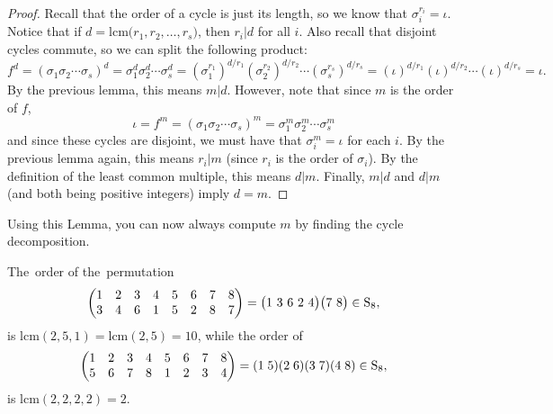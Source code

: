 \documentclass[11pt,dvipsnames]{book}
\numberwithin{figure}{section} %
\numberwithin{table}{section} %
\begin{document}
\begin{proof}
Recall that the order of a cycle is just its length, so we know that $\sigma_i^{r_i}=\iota$. 
Notice that if $d= \mathrm{lcm}\big(r_{1},r_{2},\ldots,r_{s}\big)$, then $r_i|d$ for all $i$. Also recall that disjoint cycles commute, so we can split the following product:
\[
f^{d} = (\sigma_{1}\sigma_{2}\cdots\sigma_{s})^{d}
=\sigma_{1}^{d}\sigma_{2}^{d}\cdots \sigma_{s}^{d} 
=(\sigma_{1}^{r_{1}})^{d/r_{1}}(\sigma_{2}^{r_{2}})^{d/r_{2}}\cdots(\sigma_{s}^{r_{s}})^{d/r_{s}} =
(\iota)^{d/r_{1}}(\iota)^{d/r_{2}}\cdots (\iota)^{d/r_{s}}=\iota. 
\]
By the previous lemma, this means $m|d$. However, note that since $m$ is the order of $f$,
\[
\iota = f^{m} = (\sigma_{1}\sigma_{2}\cdots\sigma_{s})^{m}
=\sigma_{1}^{m}\sigma_{2}^{m}\cdots \sigma_{s}^{m} 
\]
and since these cycles are disjoint, we must have that $\sigma_{i}^{m}=\iota$ for each $i$. By the previous lemma again, this means $r_i|m$ (since $r_i$ is the order of $\sigma_i$). By the definition of the least common multiple, this means $d|m$. Finally, $m|d$ and $d|m$ (and both being positive integers) imply $d=m$.
\end{proof}

Using this Lemma, you can now always compute $m$ by finding the cycle decomposition.

 \begin{example} The~order of the~permutation
$$
\left(\begin{matrix} %
1 & 2 & 3 & 4 & 5 & 6 & 7 & 8\cr%
3 & 4 & 6 & 1 & 5 & 2 & 8 & 7\cr%
\end{matrix}\right) = \big(1\ 3\ 6\ 2\ 4\big)\big(7\ 8\big)\in\mathrm{S}_{8},%
$$
 is $\mathrm{lcm}(2, 5, 1)=\mathrm{lcm}(2, 5)=10$, while the order of 
 $$
\left(\begin{matrix} %
1 & 2 & 3 & 4 & 5 & 6 & 7 & 8\cr%
5 & 6 & 7 & 8 & 1 & 2 & 3 & 4\cr%
\end{matrix}\right) =  (1 \; 5)(2 \; 6)(3\; 7)(4\; 8) \in\mathrm{S}_{8},%
$$
is $\mathrm{lcm}(2,2,2,2)=2$.
 \end{example}


%
%
%
%
%
%
%
%
\end{document}
